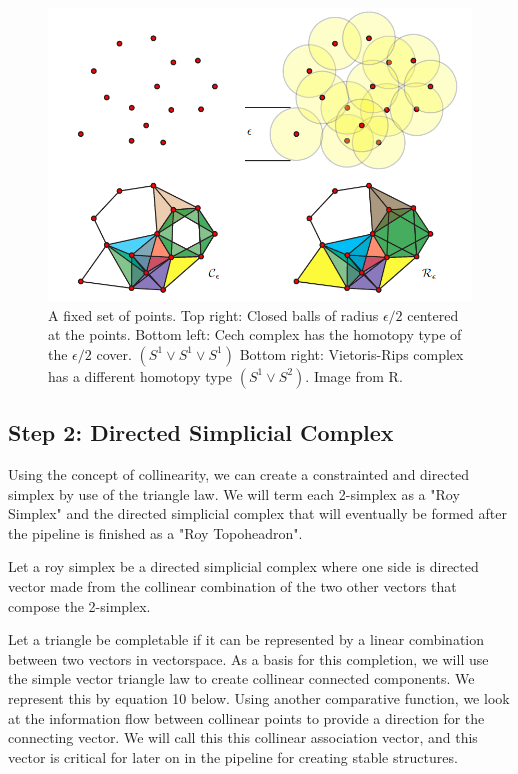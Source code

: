  \begin{figure}[H]
  \includegraphics[width=\linewidth]{images/vrcomplex}
  \caption{A fixed set of points. Top right: Closed balls of radius $\epsilon/2$ centered at the points. Bottom left: Cech complex has the homotopy type of the $\epsilon/2$ cover. $(S^1\vee S^1\vee S^1)$ Bottom right: Vietoris-Rips complex has a different homotopy type $(S^1\vee S^2)$. Image from R. }
  \label{vrcomplex} 
\end{figure}

\subsection{Step 2: Directed Simplicial Complex}

\par Using the concept of collinearity, we can create a constrainted and directed simplex by use of the triangle law. We will term each 2-simplex as a "Roy Simplex" and the directed simplicial complex that will eventually be formed after the pipeline is finished as a "Roy Topoheadron". 

\begin{definition}
  Let a roy simplex be a directed simplicial complex where one side is directed vector made from the collinear combination of the two other vectors that compose the 2-simplex.
\end{definition}
  Let a triangle be completable if it can be represented by a linear combination between two vectors in vectorspace. As a basis for this completion, we will use the simple vector triangle law to create collinear connected components. We represent this by equation 10 below. Using another comparative function, we look at the information flow between collinear points to provide a direction for the connecting vector. We will call this this collinear association vector, and this vector is critical for later on in the pipeline for creating stable structures.


